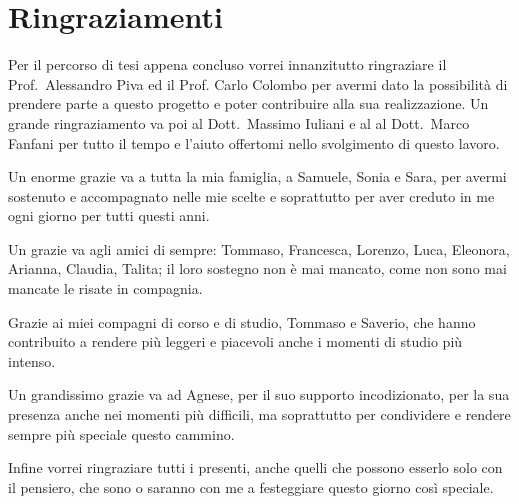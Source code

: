 \chapter*{Ringraziamenti}

Per il percorso di tesi appena concluso vorrei innanzitutto ringraziare il Prof.~Alessandro Piva ed il Prof. Carlo Colombo per avermi dato la possibilità di prendere parte a questo progetto e poter contribuire alla sua realizzazione. Un grande ringraziamento va poi al Dott.~Massimo Iuliani e al al Dott.~Marco Fanfani per tutto il tempo e l'aiuto offertomi nello svolgimento di questo lavoro.

Un enorme grazie va a tutta la mia famiglia, a Samuele, Sonia e Sara, per avermi sostenuto e accompagnato nelle mie scelte e soprattutto per aver creduto in me ogni giorno per tutti questi anni.

Un grazie va agli amici di sempre: Tommaso, Francesca, Lorenzo, Luca, Eleonora, Arianna, Claudia, Talita; il loro sostegno non è mai mancato, come non sono mai mancate le risate in compagnia.

Grazie ai miei compagni di corso e di studio, Tommaso e Saverio, che hanno contribuito a rendere più leggeri e piacevoli anche i momenti di studio più intenso.

Un grandissimo grazie va ad Agnese, per il suo supporto incodizionato, per la sua presenza anche nei momenti più difficili, ma soprattutto per condividere e rendere sempre più speciale questo cammino.

Infine vorrei ringraziare tutti i presenti, anche quelli che possono esserlo solo con il pensiero, che sono o saranno con me a festeggiare questo giorno così speciale.
